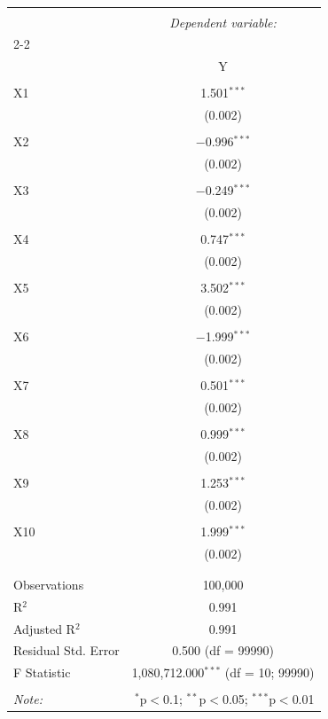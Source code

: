 \documentclass{article}
\begin{document}
\begin{table}[!htbp] \centering
  \caption{}
  \label{}
\begin{tabular}{@{\extracolsep{5pt}}lc}
\\[-1.8ex]\hline
\hline \\[-1.8ex]
 & \multicolumn{1}{c}{\textit{Dependent variable:}} \\
\cline{2-2}
\\[-1.8ex] & Y \\
\hline \\[-1.8ex]
 X1 & 1.501$^{***}$ \\
  & (0.002) \\
  & \\
 X2 & $-$0.996$^{***}$ \\
  & (0.002) \\
  & \\
 X3 & $-$0.249$^{***}$ \\
  & (0.002) \\
  & \\
 X4 & 0.747$^{***}$ \\
  & (0.002) \\
  & \\
 X5 & 3.502$^{***}$ \\
  & (0.002) \\
  & \\
 X6 & $-$1.999$^{***}$ \\
  & (0.002) \\
  & \\
 X7 & 0.501$^{***}$ \\
  & (0.002) \\
  & \\
 X8 & 0.999$^{***}$ \\
  & (0.002) \\
  & \\
 X9 & 1.253$^{***}$ \\
  & (0.002) \\
  & \\
 X10 & 1.999$^{***}$ \\
  & (0.002) \\
  & \\
\hline \\[-1.8ex]
Observations & 100,000 \\
R$^{2}$ & 0.991 \\
Adjusted R$^{2}$ & 0.991 \\
Residual Std. Error & 0.500 (df = 99990) \\
F Statistic & 1,080,712.000$^{***}$ (df = 10; 99990) \\
\hline
\hline \\[-1.8ex]
\textit{Note:}  & \multicolumn{1}{r}{$^{*}$p$<$0.1; $^{**}$p$<$0.05; $^{***}$p$<$0.01} \\
\end{tabular}
\end{table}
\end{document}

